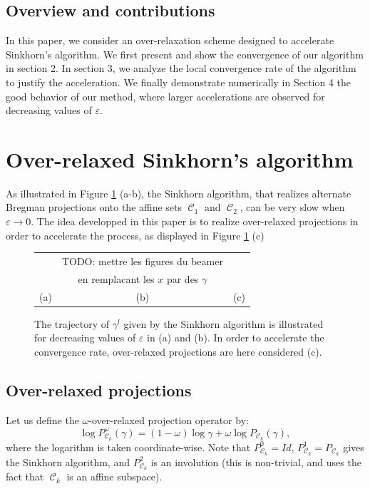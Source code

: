 \documentclass{article} %
\DeclareMathOperator{\Ccal}{\mathcal{C}}
\renewcommand{\epsilon}{\varepsilon}
\theoremstyle{plain}
\theoremstyle{definition}
\theoremstyle{remark}
\begin{document}
\subsection{Overview and contributions}
In this paper, we consider an over-relaxation scheme designed to accelerate   Sinkhorn's algorithm. We first present and show the convergence of our algorithm in section 2. In section 3, we analyze the local convergence rate of the algorithm to justify the acceleration.
We finally demonstrate numerically  in Section 4 the good behavior of our method, where larger accelerations are observed for decreasing values of $\epsilon$.



\section{Over-relaxed Sinkhorn's algorithm}

As illustrated in Figure \ref{alternate_projections} (a-b), the Sinkhorn algorithm, that  realizes alternate Bregman projections onto the affine sets $\Ccal_1$ and $\Ccal_2$, can be very slow when $\epsilon\to 0$. The idea developped in this paper is to realize over-relaxed projections in order to accelerate the process, as displayed in Figure \ref{alternate_projections} (c) 

\begin{figure}[ht!]
\begin{center}
\begin{tabular}{ccc}
&TODO: mettre les figures du beamer\\
&en remplacant les $x$ par des $\gamma$\\
(a)&(b)&(c)
\end{tabular}
\caption{\label{alternate_projections} The trajectory of $\gamma^l$ given by the Sinkhorn algorithm is illustrated for decreasing values of $\epsilon$ in (a) and (b). In order to accelerate the convergence rate, over-relaxed projections are here considered (c).}
\end{center}
\end{figure}
\subsection{Over-relaxed projections}

Let us define the $\omega$-over-relaxed projection operator by:
\begin{equation}\label{eq:def_or_proj}
\log P^\omega_{\Ccal_k}(\gamma) = (1-\omega) \log \gamma + \omega \log P_{\Ccal_k}(\gamma),
\end{equation}
where the logarithm is taken coordinate-wise.
Note that $P_{\Ccal_k}^0 = Id$, $P_{\Ccal_k}^1 = P_{\Ccal_k}$ gives the Sinkhorn algorithm, and $P_{\Ccal_k}^2$ is an involution (this is non-trivial, and uses the fact that $\Ccal_k$ is an affine subspace).
\end{document}
